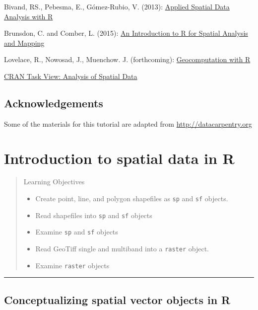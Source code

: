 \documentclass[]{book}
\providecommand{\tightlist}{%
  \setlength{\itemsep}{0pt}\setlength{\parskip}{0pt}}
\theoremstyle{definition}
\theoremstyle{definition}
\theoremstyle{definition}
\theoremstyle{remark}
\begin{document}
Bivand, RS., Pebesma, E., Gómez-Rubio, V. (2013):
\href{https://link.springer.com/book/10.1007\%2F978-1-4614-7618-4}{Applied
Spatial Data Analysis with R}

Brunsdon, C. and Comber, L. (2015):
\href{https://us.sagepub.com/en-us/nam/an-introduction-to-r-for-spatial-analysis-and-mapping/book241031}{An
Introduction to R for Spatial Analysis and Mapping}

Lovelace, R., Nowosad, J., Muenchow. J. (forthcoming):
\href{https://geocompr.robinlovelace.net}{Geocomputation with R}

\href{https://CRAN.R-project.org/view=Spatial}{CRAN Task View: Analysis
of Spatial Data}

\section*{Acknowledgements}\label{acknowledgements}

Some of the materials for this tutorial are adapted from
\url{http://datacarpentry.org}

\chapter{Introduction to spatial data in R}\label{intro}

\begin{quote}
Learning Objectives

\begin{itemize}
\tightlist
\item
  Create point, line, and polygon shapefiles as \texttt{sp} and
  \texttt{sf} objects.
\item
  Read shapefiles into \texttt{sp} and \texttt{sf} objects
\item
  Examine \texttt{sp} and \texttt{sf} objects
\item
  Read GeoTiff single and multiband into a \texttt{raster} object.
\item
  Examine \texttt{raster} objects
\end{itemize}
\end{quote}

\begin{center}\rule{0.5\linewidth}{\linethickness}\end{center}

\section{Conceptualizing spatial vector objects in
R}\label{conceptualizing-spatial-vector-objects-in-r}
\end{document}
